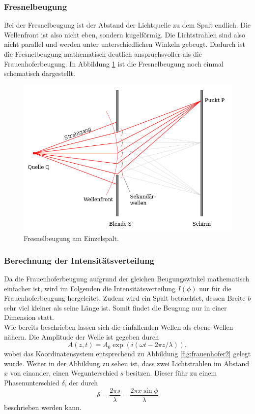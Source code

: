 \subsubsection*{Fresnelbeugung}
Bei der Fresnelbeugung ist der Abstand der Lichtquelle zu dem Spalt endlich. Die Wellenfront ist also nicht eben, sondern kugelförmig. Die Lichtstrahlen sind also
nicht parallel und werden unter unterschiedlichen Winkeln gebeugt. Dadurch ist die Fresnelbeugung mathematisch deutlich anspruchsvoller als die Frauenhoferbeugung.
In Abbildung \ref{fig:fresnel} ist die Fresnelbeugung noch einmal schematisch dargestellt.
\begin{figure}[H]
    \centering
    \includegraphics[scale = 0.45]{pictures/fresnel.png}
    \caption{Fresnelbeugung am Einzelspalt. \cite{AP02}}
    \label{fig:fresnel}
\end{figure}
\noindent

\subsubsection*{Berechnung der Intensitätsverteilung}
\label{sec:intensität}
Da die Frauenhoferbeugung aufgrund der gleichen Beugungswinkel mathematisch einfacher ist, wird im Folgenden die Intensitätsverteilung $I(\phi)$ 
nur für die Frauenhoferbeugung hergeleitet. Zudem wird ein Spalt betrachtet, dessen Breite $b$ sehr viel kleiner als seine Länge ist. Somit findet
die Beugung nur in einer Dimension statt.
\\\noindent
Wie bereits beschrieben lassen sich die einfallenden Wellen als ebene Wellen nähern. Die Amplitude der Welle ist gegeben durch 
\begin{equation*}
    A(z,t)=A_0\exp{(i(\omega t-2\pi z/\lambda))}    ,
    \label{eqn:ebenewelle}
\end{equation*}
wobei das Koordinatensystem entsprechend zu Abbildung \ref{fig:frauenhofer2} gelegt wurde. Weiter in der Abbildung zu sehen ist, dass zwei 
Lichtstrahlen im Abstand $x$ von einander, einen Wegunterschied $s$ besitzen. Dieser führ zu einem Phasenunterschied $\delta$, der durch 
\begin{equation*}
    \delta=\frac{2\pi s}{\lambda}=\frac{2\pi x \sin{\phi}}{\lambda}
    \label{eqn:phase}
\end{equation*} 
beschrieben werden kann. 

